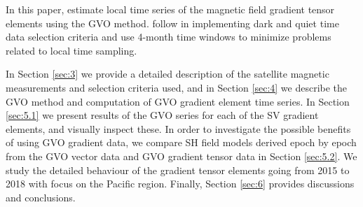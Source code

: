 \documentclass[extra,mreferee]{gji}
\begin{document}


In this paper,  estimate local time series of the magnetic field gradient tensor elements using the GVO method.   follow \cite{Hammer_etal_2021a} in implementing dark and quiet time data selection criteria and use 4-month time windows to minimize problems related to local time sampling. 

In Section \ref{sec:3} we provide a detailed description of the satellite magnetic measurements and selection criteria used, and in Section \ref{sec:4} we describe the GVO method and  computation of  GVO  gradient element  time series. In Section \ref{sec:5.1} we present results of the GVO series for each of the SV gradient elements, and visually inspect these. In order to investigate the possible benefits of using GVO gradient data, we compare SH field models derived epoch by epoch from the GVO vector data and GVO gradient tensor data in Section \ref{sec:5.2}. We study the detailed behaviour of the gradient tensor elements going from 2015 to 2018 with  focus on the Pacific region. Finally, Section \ref{sec:6} provides discussions and conclusions.
\end{document}
